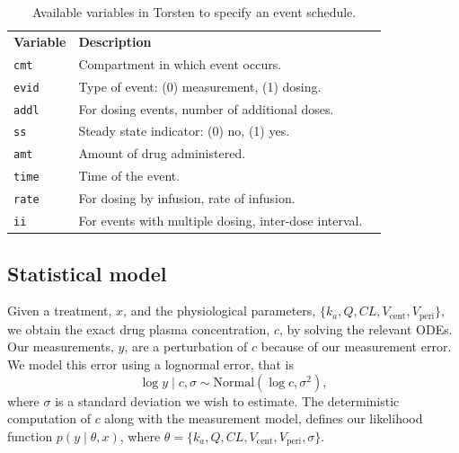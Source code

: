 \begin{table}
  \renewcommand{\arraystretch}{1.5}
  \begin{center}
  \begin{tabular} {l l l}
  \rowcolor[gray]{0.95} \textbf{Variable} & \textbf{Description} \\
  \texttt{cmt} & Compartment in which event occurs.\\
  \rowcolor[gray]{0.95} \texttt{evid} & Type of event: (0) measurement, (1) dosing. \\
  \texttt{addl} & For dosing events, number of additional doses.  \\
  \rowcolor[gray]{0.95} \texttt{ss} & Steady state indicator: (0) no, (1) yes. \\
  \texttt{amt} & Amount of drug administered. \\
  \rowcolor[gray]{0.95} \texttt{time} & Time of the event. \\
  \texttt{rate} & For dosing by infusion, rate of infusion. \\
  \rowcolor[gray]{0.95} \texttt{ii} & For events with multiple dosing, inter-dose interval.
  \end{tabular}
  \end{center}
  \caption{Available variables in Torsten to specify an event schedule.}
  \label{tab:event_schedule}
\end{table}

\subsection{Statistical model}

Given a treatment, $x$, and the physiological parameters, $\{ k_a, Q, CL, V_\mathrm{cent}, V_\mathrm{peri} \}$, we obtain the exact drug plasma concentration, $c$, by solving the relevant ODEs.
Our measurements, $y$, are a perturbation of $c$ because of our measurement error.
We model this error using a lognormal error, that is
\begin{equation*}
  \log y \mid c, \sigma \sim \mathrm{Normal}(\log c, \sigma^2),
\end{equation*}
where $\sigma$ is a standard deviation we wish to estimate.
The deterministic computation of $c$ along with the measurement model, defines our likelihood function $p(y \mid \theta, x)$, where $\theta = \{ k_a, Q, CL, V_\mathrm{cent}, V_\mathrm{peri}, \sigma \}$.

